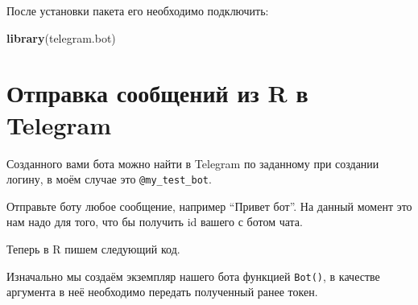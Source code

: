 \documentclass[
]{book}
\newenvironment{Shaded}{\begin{snugshade}}{\end{snugshade}}
\newcommand{\AttributeTok}[1]{\textcolor[rgb]{0.13,0.29,0.53}{#1}}
\newcommand{\CommentTok}[1]{\textcolor[rgb]{0.56,0.35,0.01}{\textit{#1}}}
\newcommand{\DataTypeTok}[1]{\textcolor[rgb]{0.13,0.29,0.53}{#1}}
\newcommand{\DecValTok}[1]{\textcolor[rgb]{0.00,0.00,0.81}{#1}}
\newcommand{\FunctionTok}[1]{\textcolor[rgb]{0.13,0.29,0.53}{\textbf{#1}}}
\newcommand{\NormalTok}[1]{#1}
\newcommand{\OtherTok}[1]{\textcolor[rgb]{0.56,0.35,0.01}{#1}}
\newcommand{\SpecialCharTok}[1]{\textcolor[rgb]{0.81,0.36,0.00}{\textbf{#1}}}
\newcommand{\StringTok}[1]{\textcolor[rgb]{0.31,0.60,0.02}{#1}}
\begin{document}
После установки пакета его необходимо подключить:

\begin{Shaded}
\begin{Highlighting}[]
\FunctionTok{library}\NormalTok{(telegram.bot)}
\end{Highlighting}
\end{Shaded}

\section{Отправка сообщений из R в Telegram}\label{ux43eux442ux43fux440ux430ux432ux43aux430-ux441ux43eux43eux431ux449ux435ux43dux438ux439-ux438ux437-r-ux432-telegram}

Созданного вами бота можно найти в Telegram по заданному при создании логину, в моём случае это \texttt{@my\_test\_bot}.

Отправьте боту любое сообщение, например ``Привет бот''. На данный момент это нам надо для того, что бы получить id вашего с ботом чата.

Теперь в R пишем следующий код.

\begin{Shaded}
\end{Shaded}

Изначально мы создаём экземпляр нашего бота функцией \texttt{Bot()}, в качестве аргумента в неё необходимо передать полученный ранее токен.
\end{document}
